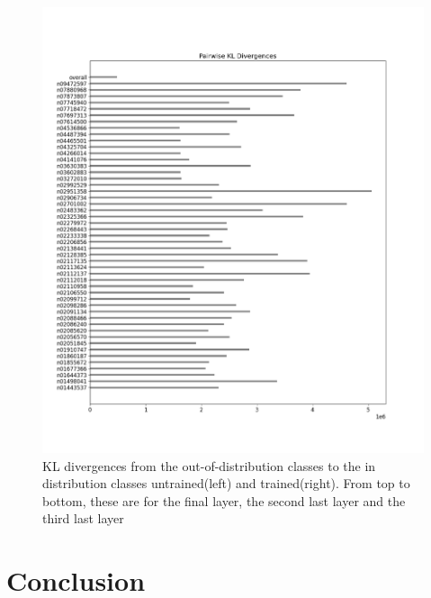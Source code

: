\documentclass{article}
\begin{document}
\begin{figure}[H]
\begin{minipage}{0.45\textwidth}
        \end{minipage}\hfill
        \begin{minipage}{0.45\textwidth}
            \centering
            \includegraphics[width=\textwidth]{cross_imagenet_imgr_r_third_last/alexnet_kl_div_b_to_apairwise.png} %
        \end{minipage}
    \caption{KL divergences from the out-of-distribution classes to the in distribution classes untrained(left) and trained(right). From top to bottom, these are for the final layer, the second last layer and the third last layer}
        \label{fig:cross_kl_divergence_b_to_a}
    \end{figure}
    \section{Conclusion}
        
    
    
\end{document}
